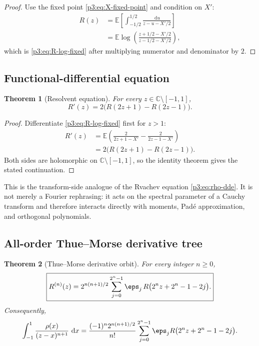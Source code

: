 \documentclass[11pt,oneside]{article}
\newtheorem{theorem}{Theorem}[section]
\theoremstyle{definition}
\newcommand{\dd}{\,\mathrm d}
\newcommand{\E}{\mathbb E}
\newcommand{\C}{\mathbb C}
\begin{document}
\begin{proof}
Use the fixed point \eqref{p3:eq:X-fixed-point} and condition on \(X'\):
\begin{align*}
 R(z)
 &=\E\left[\int_{-1/2}^{1/2}
   \frac{\dd u}{z-u-X'/2}\right]\\
 &=\E\log\!\left(\frac{z+1/2-X'/2}{z-1/2-X'/2}\right),
\end{align*}
which is \eqref{p3:eq:R-log-fixed} after multiplying numerator and denominator by \(2\).
\end{proof}

\subsection{Functional-differential equation}

\begin{theorem}[Resolvent equation]\label{p3:thm:R-dde}
For every \(z\in\C\setminus[-1,1]\),
\begin{equation}
 \boxed{R'(z)=2\bigl(R(2z+1)-R(2z-1)\bigr).}                \label{p3:eq:R-dde}
\end{equation}
\end{theorem}

\begin{proof}
Differentiate \eqref{p3:eq:R-log-fixed} first for \(z>1\):
\begin{align*}
 R'(z)
 &=\E\left(\frac{2}{2z+1-X'}-\frac{2}{2z-1-X'}\right)\\
 &=2\bigl(R(2z+1)-R(2z-1)\bigr).
\end{align*}
Both sides are holomorphic on \(\C\setminus[-1,1]\), so the identity theorem gives the
stated continuation.
\end{proof}

This is the transform-side analogue of the Rvachev equation \eqref{p3:eq:rho-dde}.  It is
not merely a Fourier rephrasing: it acts on the spectral parameter of a Cauchy transform and
therefore interacts directly with moments, Pad\'e approximation, and orthogonal polynomials.

\subsection{All-order Thue--Morse derivative tree}

\begin{theorem}[Thue--Morse derivative orbit]\label{p3:thm:R-derivative-tree}
For every integer \(n\ge0\),
\begin{equation}
 \boxed{
 R^{(n)}(z)=2^{n(n+1)/2}
 \sum_{j=0}^{2^n-1}\eps_j\,
 R\bigl(2^n z+2^n-1-2j\bigr).
 }                                                           \label{p3:eq:R-derivative-tree}
\end{equation}
Consequently,
\begin{equation}
 \int_{-1}^{1}\frac{\rho(x)}{(z-x)^{n+1}}\,\dd x
 =\frac{(-1)^n2^{n(n+1)/2}}{n!}
 \sum_{j=0}^{2^n-1}\eps_j
 R\bigl(2^n z+2^n-1-2j\bigr).                               \label{p3:eq:R-kernel-tree}
\end{equation}
\end{theorem}
\end{document}
